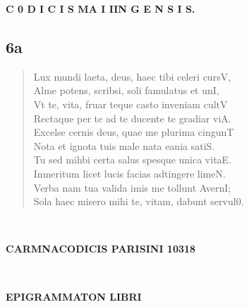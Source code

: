 \documentclass[11pt, a4paper]{report}
\begin{document}
            \begin{center} \textbf{C 0 D I C I S MA I IIN G E N S I S.} \end{center}
            \subsection*{6a}
      \begin{verse}
      Lux mundi laeta, deus, haec tibi celeri cursV, \\ Alme potens, scribsi, soli famulatus et unI, \\ Vt te, vita, fruar teque casto inveniam cultV \\ Rectaque per te ad te ducente te gradiar viA. \\ Excelse cernis deus, quae me plurima cingunT \\ Nota et ignota tuis male nata eania satiS. \\ Tu sed mihbi certa salus spesque unica vitaE. \\ Inmeritum licet lucis facias adtingere limeN. \\ Verba nam tua valida imis me tollunt AvernI; \\ Sola haec misero mihi te, vitam, dabunt servul0. \\ 
      \end{verse}
  
            
        ﻿\pagebreak 
    
            \begin{center} \textbf{CARMNACODICIS PARISINI 10318} \end{center}
            
        ﻿\pagebreak 
    
            \begin{center} \textbf{EPIGRAMMATON LIBRI} \end{center}
\end{document}
